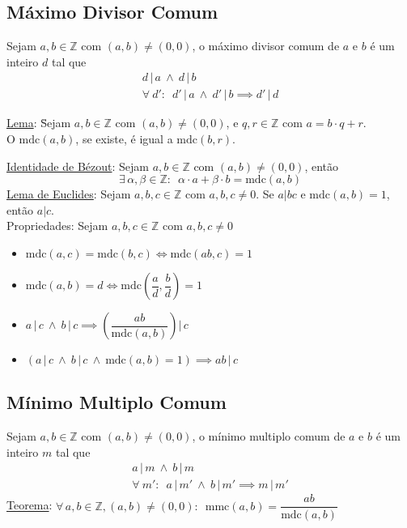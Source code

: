 \documentclass{article}
\begin{document}
\subsection{Máximo Divisor Comum}
Sejam $a, b \in \mathbb{Z}$ com $(a, b) \neq (0, 0)$, o máximo divisor comum de $a$ e $b$ é um inteiro $d$ tal que
\begin{gather*}
  d \,|\, a \> \land \> d \,|\, b \\[5pt]
  \forall \> d': \enspace d' \,|\, a \> \land \> d' \,|\, b \implies d' \,|\, d
\end{gather*}
\vspace{-10pt}
\begin{tabbing}
  \uline{Lema}: \= Sejam $a, b \in \mathbb{Z}$ com $(a,b) \neq (0,0)$, e $q, r \in \mathbb{Z}$ com $a = b \cdot q + r$. \\
  \> O $\text{mdc}(a,b)$, se existe, é igual a $\text{mdc}(b, r)$.
\end{tabbing}
\vspace{7pt}
\uline{Identidade de Bézout}: Sejam $a, b \in \mathbb{Z}$ com $(a,b) \neq (0,0)$, então
\vspace{-5pt}
\[ \exists \, \alpha, \beta \in \mathbb{Z}: \enspace \alpha \cdot a + \beta \cdot b = \text{mdc}(a,b) \]
\uline{Lema de Euclides}: Sejam $a,b,c \in \mathbb{Z}$ com $a,b,c \neq 0$. Se $a|bc$ e $\text{mdc}(a,b) = 1$, então $a|c$. \\[10pt]
Propriedades: Sejam $a,b,c \in \mathbb{Z}$ com $a,b,c \neq 0$
\begin{itemize}
  \item $\text{mdc}(a,c) = \text{mdc}(b,c) \iff \text{mdc}(a b,c) = 1$
  \item $\text{mdc}(a,b) = d \iff \text{mdc} \left( \dfrac{a}{d}, \dfrac{b}{d} \right) = 1$
  \item $a \,|\, c \:\land\: b \,|\, c \implies \left( \dfrac{ab}{\text{mdc}(a,b)} \right) \bigg | \, c$
  \item $(a \,|\, c \:\land\: b \,|\, c \:\land\: \text{mdc}(a,b) = 1) \implies ab \,|\, c$
\end{itemize}


\subsection{Mínimo Multiplo Comum}
Sejam $a, b \in \mathbb{Z}$ com $(a, b) \neq (0, 0)$, o mínimo multiplo comum de $a$ e $b$ é um inteiro $m$ tal que
\begin{gather*}
  a \,|\, m \:\land\: b \,|\, m \\[5pt]
  \forall \> m': \enspace a \,|\, m' \:\land\: b \,|\, m' \implies m \,|\, m'
\end{gather*}
\uline{Teorema}: $\forall \, a, b \in \mathbb{Z}, (a, b) \neq (0, 0): \enspace \text{mmc}(a,b) = \dfrac{ab}{\text{mdc}(a,b)}$
\end{document}
